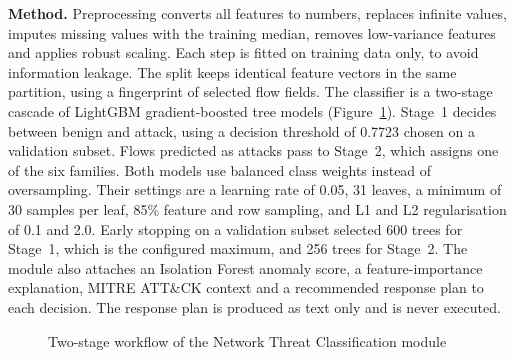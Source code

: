 \textbf{Method.} Preprocessing converts all features to numbers, replaces infinite values, imputes missing values with the training median, removes low-variance features and applies robust scaling. Each step is fitted on training data only, to avoid information leakage. The split keeps identical feature vectors in the same partition, using a fingerprint of selected flow fields. The classifier is a two-stage cascade of LightGBM gradient-boosted tree models \cite{ke2017lightgbm} (Figure~\ref{fig:ntc-flow}). Stage~1 decides between benign and attack, using a decision threshold of 0.7723 chosen on a validation subset. Flows predicted as attacks pass to Stage~2, which assigns one of the six families. Both models use balanced class weights instead of oversampling. Their settings are a learning rate of 0.05, 31 leaves, a minimum of 30 samples per leaf, 85\% feature and row sampling, and L1 and L2 regularisation of 0.1 and 2.0. Early stopping on a validation subset selected 600 trees for Stage~1, which is the configured maximum, and 256 trees for Stage~2. The module also attaches an Isolation Forest anomaly score, a feature-importance explanation, MITRE ATT\&CK context \cite{strom2018attack} and a recommended response plan to each decision. The response plan is produced as text only and is never executed.

\begin{figure}[H]
\centering
{}
\caption{Two-stage workflow of the Network Threat Classification module}
\label{fig:ntc-flow}
\end{figure}

